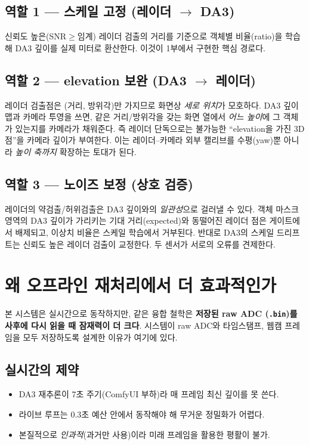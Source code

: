\section{역할 1 — 스케일 고정 (레이더 $\to$ DA3)}
신뢰도 높은(SNR$\ge$임계) 레이더 검출의 거리를 기준으로 객체별 비율(ratio)을
학습해 DA3 깊이를 실제 미터로 환산한다. 이것이 1부에서 구현한 핵심 경로다.

\section{역할 2 — elevation 보완 (DA3 $\to$ 레이더)}
레이더 검출점은 (거리, 방위각)만 가지므로 화면상 \emph{세로 위치}가 모호하다.
DA3 깊이맵과 카메라 투영을 쓰면, 같은 거리/방위각을 갖는 화면 열에서 \emph{어느
높이}에 그 객체가 있는지를 카메라가 채워준다. 즉 레이더 단독으로는 불가능한
``elevation을 가진 3D 점''을 카메라 깊이가 부여한다. 이는 레이더--카메라
외부 캘리브를 수평(yaw)뿐 아니라 \emph{높이 축까지} 확장하는 토대가 된다.

\section{역할 3 — 노이즈 보정 (상호 검증)}
레이더의 약검출/허위검출은 DA3 깊이와의 \emph{일관성}으로 걸러낼 수 있다.
객체 마스크 영역의 DA3 깊이가 가리키는 기대 거리(expected)와 동떨어진 레이더
점은 게이트에서 배제되고, 이상치 비율은 스케일 학습에서 거부된다. 반대로
DA3의 스케일 드리프트는 신뢰도 높은 레이더 검출이 교정한다. 두 센서가 서로의
오류를 견제한다.

\chapter{왜 오프라인 재처리에서 더 효과적인가}

본 시스템은 실시간으로 동작하지만, 같은 융합 철학은 \textbf{저장된 raw ADC
(\texttt{.bin})를 사후에 다시 읽을 때 잠재력이 더 크다}. 시스템이 raw ADC와
타임스탬프, 웹캠 프레임을 모두 저장하도록 설계한 이유가 여기에 있다.

\section{실시간의 제약}
\begin{itemize}
  \item DA3 재추론이 7초 주기(ComfyUI 부하)라 매 프레임 최신 깊이를 못 쓴다.
  \item 라이브 루프는 0.3초 예산 안에서 동작해야 해 무거운 정밀화가 어렵다.
  \item 본질적으로 \emph{인과적}(과거만 사용)이라 미래 프레임을 활용한 평활이 불가.
\end{itemize}

